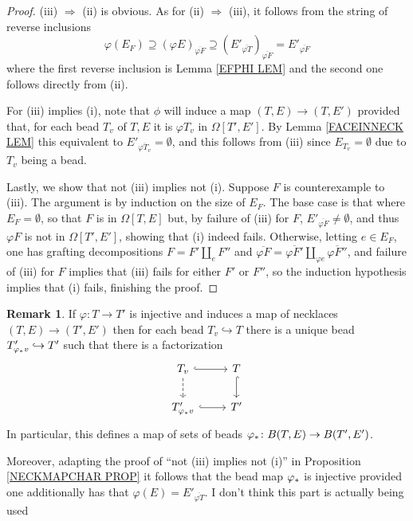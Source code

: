 \documentclass[a4paper,10pt
,draft
]{article}%
\numberwithin{equation}{section}
\numberwithin{figure}{section}
\theoremstyle{definition} %
\newtheorem{remark}[equation]{Remark}%
\newcommand{\1}{\ensuremath{\mathbbm 1}}%
\begin{document}
\begin{proof}
(iii) $\Rightarrow$ (ii) is obvious.
As for (ii) $\Rightarrow$ (iii),
it follows from the 
string of reverse inclusions
\[
\varphi(E_F)
	\supseteq
\left(\varphi E\right)_{\overline{\varphi F}}
	\supseteq
\left(E'_{\overline{\varphi T}}\right)_{\overline{\varphi F}}
	=
E'_{\overline{\varphi F}}
\]
where the first reverse inclusion is Lemma \ref{EFPHI LEM}
and the second one follows directly from (ii).


For (iii) implies (i), 
note that $\phi$ will induce a map 
$(T,E) \to (T,E')$
provided that, for each bead $T_v$ of $T,E$
it is $\varphi T_v$ in 
$\Omega[T',E']$.
By Lemma \ref{FACEINNECK LEM}
this equivalent to
$E'_{\overline{\varphi T_v}} = \emptyset$,
and this follows from (iii)
since $E_{T_v} = \emptyset$
due to $T_v$ being a bead.

Lastly, we show that not (iii) implies not (i).
Suppose $F$ is counterexample to (iii).
The argument is by induction on the size of $E_F$.
The base case is that where $E_F = \emptyset$, 
so that $F$ is in 
$\Omega[T,E]$ but, by failure of (iii) for $F$,
$E'_{\overline{\varphi F}} \neq \emptyset$,
and thus $\varphi F$ is not in 
$\Omega[T',E']$,
showing that (i) indeed fails.
Otherwise, letting $e \in E_F$, one has grafting decompositions
$F = F' \amalg_e F''$
and 
$\overline{\varphi F} = 
\overline{\varphi F'}
\amalg_{\varphi e}
\overline{\varphi F''}$,
and failure of (iii) for $F$
implies that (iii) fails for either $F'$ or $F''$,
so the induction hypothesis implies that (i) fails, finishing the proof.
\end{proof}




\begin{remark}\label{BEADMAP REM}
	If $\varphi \colon T \to T'$ is injective
	and induces a map of necklaces
	$(T,E) \to (T',E')$ then
	for each bead 
	$T_{v} \hookrightarrow T$
	there is a unique bead
	$T'_{\varphi_{\**} v} \hookrightarrow T'$
	such that there is a factorization	
\begin{equation}
\begin{tikzcd}
	T_v
	\ar[hookrightarrow]{r} 
	\ar[dashed]{d}
&
	T
	\ar[hookrightarrow]{d}
\\
	T'_{\varphi_{\**} v}
	\ar[hookrightarrow]{r}
&
	T'
\end{tikzcd}
\end{equation}
In particular, 
this defines a map of sets of beads
$\varphi_{\**} \colon 
B(T,E) \to B(T',E')$.

{\color{green} Moreover, adapting the proof of 
``not (iii) implies not (i)''
in Proposition \ref{NECKMAPCHAR PROP}
it follows that the bead map
$\varphi_{\**}$ is injective
provided one additionally has that  
$\varphi(E) = E'_{\overline{\varphi T}}$.}
{\color{red} I don't think this part is actually being used}
\end{remark}
\end{document}
